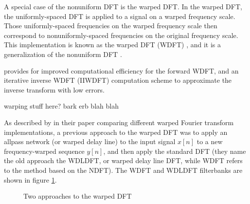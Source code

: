 \documentclass[letter,12pt,notitlepage]{article}
\begin{document}
A special case of the nonuniform DFT is the warped DFT. In the warped DFT, the uniformly-spaced DFT is applied to a signal on a warped frequency scale. Those uniformly-spaced frequencies on the warped frequency scale then correspond to nonuniformly-spaced frequencies on the original frequency scale. This implementation is known as the warped DFT (WDFT) \cite{warped1}, and it is a generalization of the nonuniform DFT \cite{nufft3}.

\citet{warped2} provides for improved computational efficiency for the forward WDFT, and an iterative inverse WDFT (IIWDFT) computation scheme to approximate the inverse transform with low errors.

warping stuff here? bark erb blah blah

As described by \citet{warpedcomparison} in their paper comparing different warped Fourier transform implementations, a previous approach to the warped DFT \cite{earlywarped1, earlywarped2} was to apply an allpass network (or warped delay line) to the input signal $x[n]$ to a new frequency-warped sequence $y[n]$, and then apply the standard DFT (they name the old approach the WDLDFT, or warped delay line DFT, while WDFT refers to the method based on the NDFT). The WDFT and WDLDFT filterbanks are shown in figure \ref{fig:wdfts}.

\begin{figure}[ht]
	\centering
	\caption{Two approaches to the warped DFT}
	\label{fig:wdfts}
\end{figure}
\end{document}
